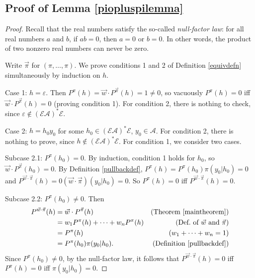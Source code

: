 \documentclass[twoside]{article}
\begin{document}
\subsection{Proof of Lemma \ref{piopluspilemma}}
\begin{proof}
    Recall that the real numbers satisfy the so-called \emph{null-factor law}:
    for all real numbers $a$ and $b$, if $ab=0$, then $a=0$ or $b=0$.
    In other words, the product of two nonzero real numbers can never be zero.

    Write $\vec\pi$ for $(\pi,\ldots,\pi)$.
    We prove conditions 1 and 2 of Definition \ref{equivdefn}
    simultaneously by induction on $h$.
 
    Case 1: $h=\varepsilon$. Then
    $P^\pi(h)=\vec w\cdot{P^{\vec\pi}}(h)=1\not=0$, so
    vacuously $P^\pi(h)=0$ iff $\vec w\cdot{P^{\vec\pi}}(h)=0$
    (proving condition 1).
    For condition 2, there is nothing to check, since
    $\varepsilon\not\in(\mathcal E\mathcal A)^*\mathcal E$.

    Case 2: $h=h_0y_0$ for some
        $h_0\in(\mathcal E\mathcal A)^*\mathcal E$, $y_0\in\mathcal A$.
        For condition 2, there is nothing to prove, since
        $h\not\in(\mathcal E\mathcal A)^*\mathcal E$.
        For condition 1, we consider two cases.

        Subcase 2.1: $P^\pi(h_0)=0$.
        By induction, condition 1 holds for $h_0$, so
        $\vec w\cdot{P^{\vec\pi}}(h_0)=0$.
        By Definition \ref{pullbackdef},
        $P^\pi(h)=P^\pi(h_0)\pi(y_0|h_0)=0$
        and $P^{\vec w\cdot\vec\pi}(h)=0(\vec w\cdot\vec\pi)(y_0|h_0)=0$.
        So $P^\pi(h)=0$ iff $P^{\vec w\cdot\vec\pi}(h)=0$.

        Subcase 2.2: $P^\pi(h_0)\not=0$.
        Then
        \begin{align*}
            P^{\vec w\cdot \vec\pi}(h)
                &= \vec w\cdot{P^{\vec\pi}}(h)
                    &\mbox{(Theorem \ref{maintheorem})}\\
                &= w_1 P^\pi(h)+\cdots+w_n P^\pi(h)
                    &\mbox{(Def.\ of $\vec w$ and $\vec\pi$)}\\
                &= P^\pi(h)
                    &\mbox{($w_1+\cdots+w_n=1$)}\\
                &= P^\pi(h_0)\pi(y_0|h_0).
                    &\mbox{(Definition \ref{pullbackdef})}
        \end{align*}
        Since $P^\pi(h_0)\not=0$,
        by the null-factor law,
        it follows that
        $P^{\vec w\cdot\vec\pi}(h)=0$ iff $P^\pi(h)=0$ iff $\pi(y_0|h_0)=0$.


\end{proof}
\end{document}
